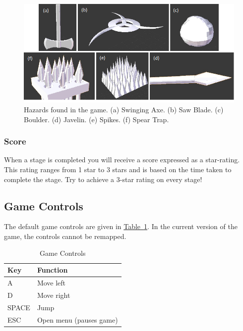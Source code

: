 \documentclass[12pt, titlepage]{article}
\begin{document}
\begin{figure}[H]
\begin{center}
\includegraphics[width=\textwidth]{hazards}
\caption[Hazards found in the game.]{Hazards found in the game.  (a) Swinging Axe.  (b) Saw Blade.  (c) Boulder.  (d) Javelin.  (e) Spikes.  (f) Spear Trap.} \label{fig:hazards}
\end{center}
\end{figure}


\subsubsection{Score}
When a stage is completed you will receive a score expressed as a star-rating.  This rating ranges from 1 star to 3 stars and is based on the time taken to complete the stage.  Try to achieve a 3-star rating on every stage!


\subsection{Game Controls}
The default game controls are given in \hyperref[tab:ctrl]{Table~\ref*{tab:ctrl}}.  In the current version of the game, the controls cannot be remapped.


\begin{table}[H]
\caption{Game Controls} \label{tab:ctrl}
\centering
\begin{tabularx}{0.65\textwidth}{p{2.5cm}X}
\toprule {\bf Key} & {\bf Function}\\
\midrule
A & Move left\\
D & Move right\\
SPACE & Jump\\
ESC & Open menu (pauses game)\\
\bottomrule
\end{tabularx}
\end{table}
\end{document}
